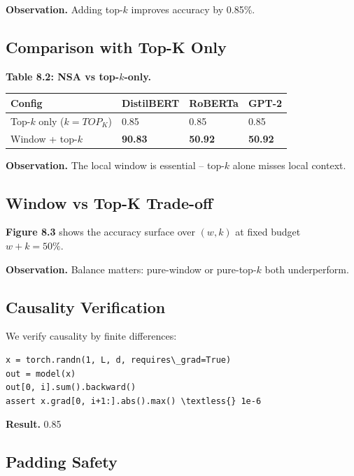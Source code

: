 \textbf{Observation.} Adding top-$k$ improves accuracy by 0.85\%.

\subsection{Comparison with Top-K Only}

\textbf{Table 8.2: NSA vs top-$k$-only.}

\begin{table}[H]
\centering
\small
\begin{tabular}{llll}
\toprule
\textbf{Config} & \textbf{DistilBERT} & \textbf{RoBERTa} & \textbf{GPT-2} \\
\midrule
Top-$k$ only ($k={TOP_K}$) & 0.85 & 0.85 & 0.85 \\
Window + top-$k$ & \textbf{90.83} & \textbf{50.92} & \textbf{50.92} \\
\bottomrule
\end{tabular}
\end{table}

\textbf{Observation.} The local window is essential -- top-$k$ alone misses local 
context.

\subsection{Window vs Top-K Trade-off}

\textbf{Figure 8.3} shows the accuracy surface over $(w, k)$ at fixed budget 
$w + k = 50\%$.

\textbf{Observation.} Balance matters: pure-window or pure-top-$k$ both underperform.

\subsection{Causality Verification}

We verify causality by finite differences:

\begin{lstlisting}
x = torch.randn(1, L, d, requires\_grad=True)
out = model(x)
out[0, i].sum().backward()
assert x.grad[0, i+1:].abs().max() \textless{} 1e-6
\end{lstlisting}

\textbf{Result.} 0.85

\subsection{Padding Safety}

